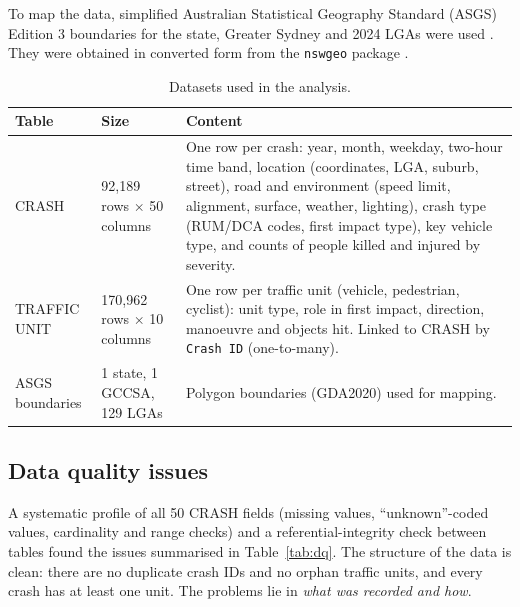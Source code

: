 \documentclass[11pt,a4paper]{article}
\begin{document}
To map the data, simplified Australian Statistical Geography Standard (ASGS) Edition 3 boundaries for the
state, Greater Sydney and 2024 LGAs were used \parencite{abs_asgs}. They were obtained in converted form
from the \texttt{nswgeo} package \parencite{suster_nswgeo}.

\begin{table}[H]
\centering
\caption{Datasets used in the analysis.}
\label{tab:datasets}
\small
\begin{tabularx}{\textwidth}{@{}P{3.4cm}P{2.3cm}L@{}}
\toprule
\textbf{Table} & \textbf{Size} & \textbf{Content} \\
\midrule
CRASH & 92,189 rows $\times$ 50 columns & One row per crash: year, month, weekday, two-hour time band, location (coordinates,
LGA, suburb, street), road and environment (speed limit, alignment, surface, weather, lighting), crash type
(RUM/DCA codes, first impact type), key vehicle type, and counts of people killed and injured by severity. \\
TRAFFIC UNIT & 170,962 rows $\times$ 10 columns & One row per traffic unit (vehicle, pedestrian, cyclist): unit type, role in first impact,
direction, manoeuvre and objects hit. Linked to CRASH by \texttt{Crash ID} (one-to-many). \\
ASGS boundaries & 1 state, 1 GCCSA, 129 LGAs & Polygon boundaries (GDA2020) used for mapping. \\
\bottomrule
\end{tabularx}
\end{table}

\subsection{Data quality issues}
A systematic profile of all 50 CRASH fields (missing values, \enquote{unknown}-coded values, cardinality and
range checks) and a referential-integrity check between tables found the issues summarised in
Table~\ref{tab:dq}. The structure of the data is clean: there are no duplicate crash IDs and no orphan traffic
units, and every crash has at least one unit. The problems lie in \emph{what was recorded and how}.
\end{document}
